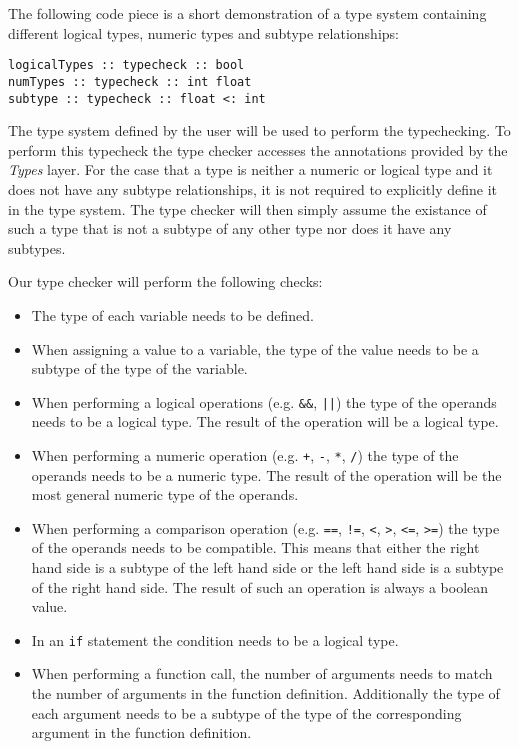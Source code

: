 The following code piece is a short demonstration of a type system containing different logical types, numeric types and subtype relationships:

\begin{lstlisting}
logicalTypes :: typecheck :: bool
numTypes :: typecheck :: int float
subtype :: typecheck :: float <: int
\end{lstlisting}

The type system defined by the user will be used to perform the typechecking. To perform this typecheck the type checker accesses the annotations provided by the \textit{Types} layer. For the case that a type is neither a numeric or logical type and it does not have any subtype relationships, it is not required to explicitly define it in the type system. The type checker will then simply assume the existance of such a type that is not a subtype of any other type nor does it have any subtypes.

Our type checker will perform the following checks:

\begin{itemize}
	\item The type of each variable needs to be defined.
	\item When assigning a value to a variable, the type of the value needs to be a subtype of the type of the variable.
	\item When performing a logical operations (e.g. \texttt{\&\&}, \texttt{||}) the type of the operands needs to be a logical type. The result of the operation will be a logical type.
	\item When performing a numeric operation (e.g. \texttt{+}, \texttt{-}, \texttt{*}, \texttt{/}) the type of the operands needs to be a numeric type. The result of the operation will be the most general numeric type of the operands.
	\item When performing a comparison operation (e.g. \texttt{==}, \texttt{!=}, \texttt{<}, \texttt{>}, \texttt{<=}, \texttt{>=}) the type of the operands needs to be compatible. This means that either the right hand side is a subtype of the left hand side or the left hand side is a subtype of the right hand side. The result of such an operation is always a boolean value.
	\item In an \texttt{if} statement the condition needs to be a logical type.
	\item When performing a function call, the number of arguments needs to match the number of arguments in the function definition. Additionally the type of each argument needs to be a subtype of the type of the corresponding argument in the function definition.
\end{itemize}

